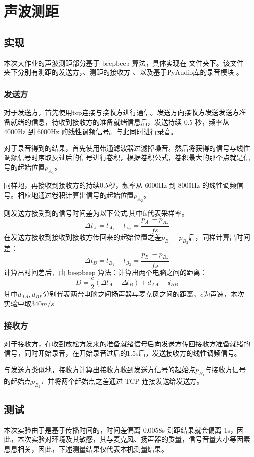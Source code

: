 \section{声波测距}
\subsection{实现}
本次大作业的声波测距部分基于 beepbeep 算法，具体实现在  文件夹下。该文件夹下分别有测距的发送方，、测距的接收方 、以及基于PyAudio库的录音模块 。 
\subsubsection{发送方}
对于发送方，首先使用tcp连接与接收方进行通信。发送方向接收方发送发送方准备就绪的信息，待收到接收方的准备就绪信息后，发送持续 0.5 秒，频率从 4000Hz 到 6000Hz 的线性调频信号。与此同时进行录音。

对于录音得到的结果，首先使用带通滤波器过滤掉噪音。然后将获得的信号与线性调频信号时序取反过后的信号进行卷积，根据卷积公式，卷积最大的那个点就是信号的起始位置$p_{A_1}$。

同样地，再接收到接收方的持续0.5秒，频率从 6000Hz 到 8000Hz 的线性调频信号。相应地通过卷积计算出信号的起始位置$p_{A_2}$。

则发送方接受到的信号时间差为以下公式,其中fs代表采样率。
$$
\Delta t_A = t_{A_1} - t_{A_2}=\frac{p_{A_1}-p_{A_2}}{fs}
$$
在发送方接收到接收到接收方传回来的起始位置之差$p_{B_1}-p_{B_2}$后，同样计算出时间差：
$$
\Delta t_B = t_{B_1} - t_{B_2}=\frac{p_{B_1}-p_{B_2}}{fs}
$$
计算出时间差后，由 beepbeep 算法：计算出两个电脑之间的距离：
$$
D = \frac{c}{2}(\Delta t_A - \Delta t_B) + d_{AA} + d_{BB}
$$
其中$d_{AA} , d_{BB}$分别代表两台电脑之间扬声器与麦克风之间的距离，$c$为声速，本次实验中取$340m/s$
\subsubsection{接收方}
对于接收方，在收到放松方发来的准备就绪信号后向发送方传回接收方准备就绪的信号，同时开始录音，在开始录音过后的1.5s后，发送接收方的线性调频信号。

与发送方类似地，接收方计算出接收方收到发送方信号的起始点$p_{B_1}$与接收方信号的起始点$p_{B_2}$，并将两个起始点之差通过 TCP 连接发送给发送方。

\subsection{测试}
本次实验由于是基于传播时间的，时间差偏离 0.0058s 测距结果就会偏离 1s，因此，本次实验对环境及其敏感，其与麦克风、扬声器的质量，信号音量大小等因素息息相关，因此，下述测量结果仅代表本机测量结果。

